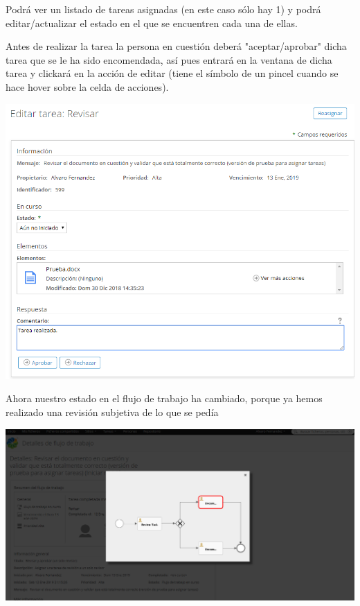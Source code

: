\documentclass{article}
\begin{document}
Podrá ver un listado de tareas asignadas (en este caso sólo hay 1) y podrá editar/actualizar el estado en el que se encuentren cada una de ellas.

Antes de realizar la tarea la persona en cuestión deberá "aceptar/aprobar" dicha tarea que se le ha sido encomendada, así pues entrará en la ventana de dicha tarea y clickará en la acción de editar (tiene el símbolo de un pincel cuando se hace hover sobre la celda de acciones).

\begin{center}
\includegraphics[scale=0.6]{images/revisar.png}
\end{center}

Ahora nuestro estado en el flujo de trabajo ha cambiado, porque ya hemos realizado una revisión subjetiva de lo que se pedía

\begin{center}
\includegraphics[scale=0.4]{images/flujo2.png}
\end{center}
\end{document}
